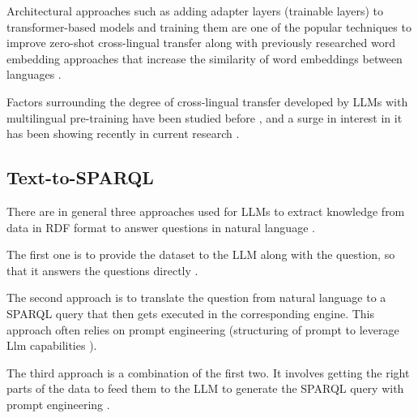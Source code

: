 Architectural approaches such as adding adapter layers (trainable layers) to transformer-based models and training them are one of the popular techniques to improve zero-shot cross-lingual transfer \cite{10.1145/3581783.3611992} along with previously researched word embedding approaches that increase the similarity of word embeddings between languages \cite{efimov2023impact}.

Factors surrounding the degree of cross-lingual transfer developed by LLMs with multilingual pre-training have been studied before \cite{fujinuma2022match}, and a surge in interest in it has been showing recently in current research \cite{wang2024probing}.


\subsection{Text-to-SPARQL}

There are in general three approaches used for LLMs to extract knowledge from data in RDF format to answer questions in natural language \cite{avila2024experiments}.

The first one is to provide the dataset to the LLM along with the question, so that it answers the questions directly \cite{avila2024experiments}.

The second approach is to translate the question from natural language to a SPARQL query that then gets executed in the corresponding engine. This approach often relies on prompt engineering \cite{zahera2024generating} (structuring of prompt to leverage Llm capabilities \cite{aws_prompt_engineering}).

The third approach is a combination of the first two. It involves getting the right parts of the data to feed them to the LLM to generate the SPARQL query with prompt engineering \cite{emonet2024llm}.